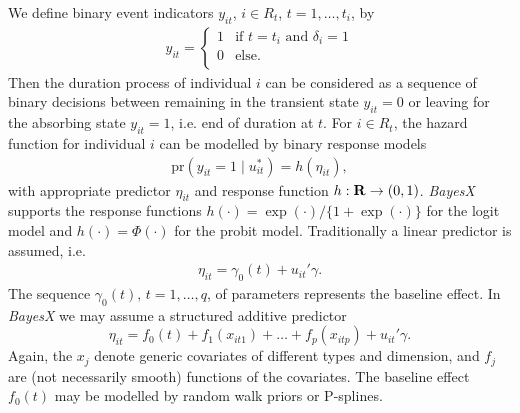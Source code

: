 We define binary event indicators $y_{it}$, $i\in R_{t}$,
$t=1,\ldots,t_{i}$, by
\begin{eqnarray*}
  y_{it}=
   \left \{ \begin{array}{ll}
             1 & \mbox{if $t=t_{i}$ and $\delta_{i}=1$}\\
             0 & \mbox{else}.\\
          \end{array}   \right.
\end{eqnarray*}
Then the duration process of individual $i$ can be considered as a
sequence of binary decisions between remaining in the transient
state $y_{it}=0$ or leaving for the absorbing state $y_{it}=1$,
i.e. end of duration at $t$. For $i \in R_{t}$, the hazard
function for individual $i$ can be modelled by binary response
models
\begin{eqnarray} \label{gleichung1}
\mbox{pr}(y_{it}=1\mid u_{it}^*)=h(\eta_{it}),
\end{eqnarray}
with appropriate predictor $\eta_{it}$ and response function $h:
{\bf R} \rightarrow (0,1)$. {\em BayesX} supports the response
functions $h(\cdot)= \exp(\cdot)/ \{1+\exp(\cdot) \}$ for the
logit model and $h(\cdot )= \Phi(\cdot)$ for the probit model.
Traditionally a linear predictor is assumed, i.e.
\begin{eqnarray} \label{gleichung2}
\eta_{it}= \gamma_{0}(t)+u_{it}' \gamma.
\end{eqnarray}
The sequence ${\gamma_{0}(t),\, t=1,\ldots,q}$, of parameters
represents the baseline effect. In {\em BayesX} we may assume a
structured additive predictor
\begin{equation}
\label{gampred2} \eta_{it}=f_0(t) +
f_{1}(x_{it1})+\dots+f_{p}(x_{itp})+u_{it}'\gamma.
\end{equation}
Again, the $x_j$ denote generic covariates of different types and
dimension, and $f_j$ are (not necessarily smooth) functions of the
covariates. The baseline effect $f_0(t)$ may be modelled by random
walk priors or P-splines.

